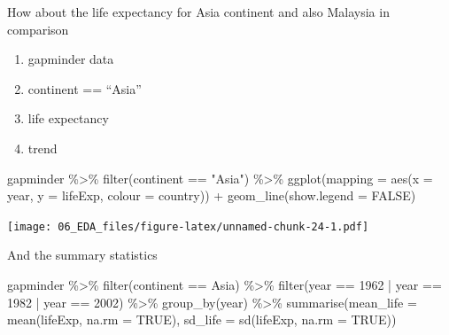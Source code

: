 \documentclass[
  10pt,
]{krantz}
\newenvironment{Shaded}{\begin{snugshade}}{\end{snugshade}}
\newcommand{\AttributeTok}[1]{\textcolor[rgb]{0.77,0.63,0.00}{#1}}
\newcommand{\ConstantTok}[1]{\textcolor[rgb]{0.00,0.00,0.00}{#1}}
\newcommand{\DecValTok}[1]{\textcolor[rgb]{0.00,0.00,0.81}{#1}}
\newcommand{\FunctionTok}[1]{\textcolor[rgb]{0.00,0.00,0.00}{#1}}
\newcommand{\NormalTok}[1]{#1}
\newcommand{\SpecialCharTok}[1]{\textcolor[rgb]{0.00,0.00,0.00}{#1}}
\newcommand{\StringTok}[1]{\textcolor[rgb]{0.31,0.60,0.02}{#1}}
\providecommand{\tightlist}{%
  \setlength{\itemsep}{0pt}\setlength{\parskip}{0pt}}
\begin{document}
How about the life expectancy for Asia continent and also Malaysia in comparison

\begin{enumerate}
\def\labelenumi{\arabic{enumi}.}
\tightlist
\item
  gapminder data
\item
  continent == ``Asia''
\item
  life expectancy
\item
  trend
\end{enumerate}

\begin{Shaded}
\begin{Highlighting}[]
\NormalTok{gapminder }\SpecialCharTok{\%\textgreater{}\%} \FunctionTok{filter}\NormalTok{(continent }\SpecialCharTok{==} \StringTok{"Asia"}\NormalTok{) }\SpecialCharTok{\%\textgreater{}\%} 
  \FunctionTok{ggplot}\NormalTok{(}\AttributeTok{mapping =} \FunctionTok{aes}\NormalTok{(}\AttributeTok{x =}\NormalTok{ year, }\AttributeTok{y =}\NormalTok{ lifeExp, }\AttributeTok{colour =}\NormalTok{ country)) }\SpecialCharTok{+}
  \FunctionTok{geom\_line}\NormalTok{(}\AttributeTok{show.legend =} \ConstantTok{FALSE}\NormalTok{)}
\end{Highlighting}
\end{Shaded}

\texttt{[image: 06\_EDA\_files/figure-latex/unnamed-chunk-24-1.pdf]}

And the summary statistics

\begin{Shaded}
\begin{Highlighting}[]
\NormalTok{gapminder }\SpecialCharTok{\%\textgreater{}\%}
  \FunctionTok{filter}\NormalTok{(continent }\SpecialCharTok{==} \StringTok{\textquotesingle{}Asia\textquotesingle{}}\NormalTok{) }\SpecialCharTok{\%\textgreater{}\%}
  \FunctionTok{filter}\NormalTok{(year }\SpecialCharTok{==} \DecValTok{1962} \SpecialCharTok{|}\NormalTok{ year }\SpecialCharTok{==} \DecValTok{1982} \SpecialCharTok{|}\NormalTok{ year }\SpecialCharTok{==} \DecValTok{2002}\NormalTok{) }\SpecialCharTok{\%\textgreater{}\%}
  \FunctionTok{group\_by}\NormalTok{(year) }\SpecialCharTok{\%\textgreater{}\%}
  \FunctionTok{summarise}\NormalTok{(}\AttributeTok{mean\_life =} \FunctionTok{mean}\NormalTok{(lifeExp, }\AttributeTok{na.rm =} \ConstantTok{TRUE}\NormalTok{), }
            \AttributeTok{sd\_life =} \FunctionTok{sd}\NormalTok{(lifeExp, }\AttributeTok{na.rm =} \ConstantTok{TRUE}\NormalTok{))}
\end{Highlighting}
\end{Shaded}
\end{document}
